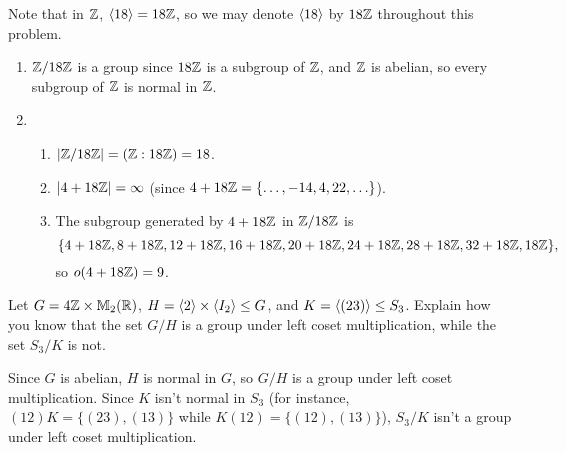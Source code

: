 \begin{solution}[print=true]
Note that in $\mathbb{Z}$, $\langle18\rangle=18\mathbb{Z}$, so we may denote $\langle18\rangle$ by $18\mathbb{Z}$ throughout this problem.

\begin{enumerate}
\item $\mathbb{Z}/18\mathbb{Z}$ is a group since $18\mathbb{Z}$ is a subgroup of $\mathbb{Z}$, and $\mathbb{Z}$ is abelian, so every subgroup of $\mathbb{Z}$ is normal in $\mathbb{Z}$.
\item

\begin{enumerate}
\item $|\mathbb{Z}/18\mathbb{Z}|=(\mathbb{Z}:18\mathbb{Z})=18$.
\item $|4+18\mathbb{Z}|=\infty$ (since $4+18\mathbb{Z}=\{\ldots, -14, 4, 22,\ldots\}$).
\item The subgroup generated by $4+18\mathbb{Z}$ in $\mathbb{Z}/18\mathbb{Z}$ is
$$\{4+18\mathbb{Z}, 8+18\mathbb{Z}, 12+18\mathbb{Z}, 16+18\mathbb{Z}, 20+18\mathbb{Z}, 24+18\mathbb{Z}, 28+18\mathbb{Z}, 32+18\mathbb{Z}, 18\mathbb{Z}\},$$ so $o(4+18\mathbb{Z})=9$.
\end{enumerate}
\end{enumerate}

\end{solution}

\begin{comment}
\begin{exercise}
Find the order of some $(\Z_n \times \Z_m )/\<(a,b)\>$.
\end{exercise}
\end{comment}

\begin{exercise} Let $G=4\mathbb{Z} \times \mathbb{M}_2(\mathbb{R})$, $H=\langle2\rangle\times \langle I_2\rangle \leq G$, and $K=\langle(23)\rangle\leq S_3$.
Explain how you know that the set $G/H$ is a group under left coset multiplication, while the set $S_3/K$ is not.
\end{exercise}

\begin{solution}[print=true]

Since $G$ is abelian, $H$ is normal in $G$, so $G/H$ is a group under left coset multiplication.  Since $K$ isn't normal in $S_3$ (for instance, $(12)K=\{(23),(13)\}$ while $K(12)=\{(12),(13)\}$), $S_3/K$ isn't a group under left coset multiplication.
\end{solution}

